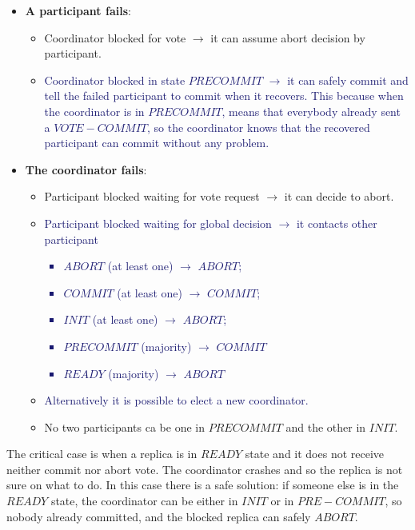 \documentclass[10pt,a4paper]{article}
\begin{document}
\begin{itemize}
	\item \textbf{A participant fails}:
	\begin{itemize}
		\item Coordinator blocked for vote $\rightarrow$ it can assume abort decision by participant.
		\item \textcolor{MidnightBlue}{Coordinator blocked in state $PRECOMMIT$ $\rightarrow$ it can safely commit and tell the failed participant to commit when it recovers. This because when the coordinator is in $PRECOMMIT$, means that everybody already sent a $VOTE-COMMIT$, so the coordinator knows that the recovered participant can commit without any problem.}
	\end{itemize}
	\item \textbf{The coordinator fails}:
	\begin{itemize}
		\item Participant blocked waiting for vote request $\rightarrow$ it can decide to abort.
		\item \textcolor{MidnightBlue}{Participant blocked waiting for global decision $\rightarrow$ it contacts other participant
		\begin{itemize}
			\item $ABORT$ (at least one) $\rightarrow$ $ABORT$;
			\item $COMMIT$ (at least one) $\rightarrow$ $COMMIT$;
			\item $INIT$ (at least one) $\rightarrow$ $ABORT$;
			\item $PRECOMMIT$ (majority) $\rightarrow$ $COMMIT$
			\item $READY$ (majority) $\rightarrow$ $ABORT$
\end{itemize}				
		}
		\item \textcolor{MidnightBlue}{Alternatively it is possible to elect a new coordinator.}
		\item No two participants ca be one in $PRECOMMIT$ and the other in $INIT$.
	\end{itemize}
\end{itemize}
The critical case is when a replica is in $READY$ state and it does not receive neither commit nor abort vote. The coordinator crashes and so the replica is not sure on what to do. In this case there is a safe solution: if someone else is in the $READY$ state, the coordinator can be either in $INIT$ or in $PRE-COMMIT$, so nobody already committed, and the blocked replica can safely $ABORT$. \pagebreak
\end{document}
